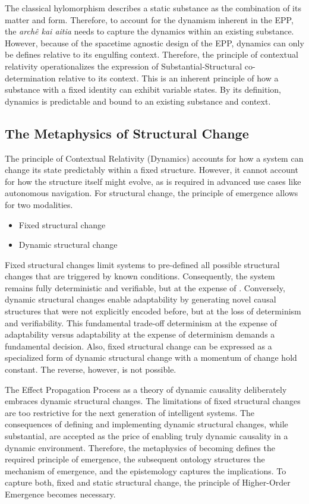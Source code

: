 The classical hylomorphism describes a static substance as the combination of its matter and form. Therefore, to account for the dynamism inherent in the EPP, the \textit{archê kai aitia} needs to capture the dynamics within an existing substance. However, because of the spacetime agnostic design of the EPP, dynamics can only be defines relative to its engulfing context. Therefore, the principle of contextual relativity operationalizes the expression of Substantial-Structural co-determination relative to its context. This is an inherent  principle of how a substance with a fixed identity can exhibit variable states. By its definition, dynamics is predictable and bound to an existing substance and context. 

\subsection{The Metaphysics of Structural Change} 
\label{sec:metaphysics_becoming}

The principle of Contextual Relativity (Dynamics) accounts for how a system can change its state predictably within a fixed structure. 
However, it cannot account for how the structure itself might evolve, as is required in advanced use cases like autonomous navigation. 
For structural change, the principle of emergence allows for two modalities.

\begin{itemize}
	\item Fixed structural change
	\item Dynamic structural change
\end{itemize}

Fixed structural changes limit systems to pre-defined all possible structural changes that are triggered by known conditions.
Consequently, the system remains fully deterministic and verifiable, but at the expense of . 
Conversely, dynamic structural changes enable adaptability by  generating novel causal structures that were not explicitly encoded before,
but at the loss of determinism and verifiability. This fundamental trade-off determinism at the expense of adaptability versus
adaptability at the expense of  determinism demands a fundamental decision. Also, fixed structural change can be expressed 
as a specialized form of dynamic structural change with a momentum of change hold constant. The reverse, however, is not possible. 

The Effect Propagation Process as a theory of dynamic causality deliberately embraces dynamic structural changes.
The limitations of fixed structural changes are too restrictive for the next generation of intelligent systems.
The consequences of defining and implementing dynamic structural changes, while substantial, 
are accepted as the price of enabling truly dynamic causality in a dynamic environment. 
Therefore, the metaphysics of becoming defines the required principle of emergence, 
the subsequent ontology structures the mechanism of emergence, and the epistemology captures 
the implications. To capture both, fixed and static structural change, the principle of Higher-Order Emergence  becomes necessary. 


